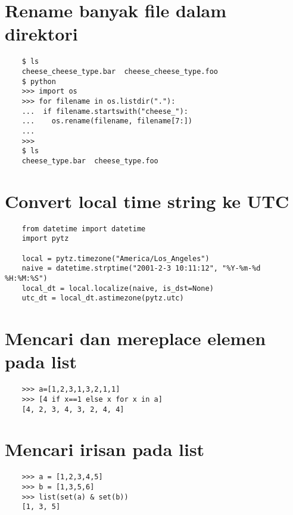 \documentclass{article}
\begin{document}
\section {Rename banyak file dalam direktori}
\begin{lstlisting}
	$ ls
	cheese_cheese_type.bar  cheese_cheese_type.foo
	$ python
	>>> import os
	>>> for filename in os.listdir("."):
	...  if filename.startswith("cheese_"):
	...    os.rename(filename, filename[7:])
	... 
	>>> 
	$ ls
	cheese_type.bar  cheese_type.foo
\end{lstlisting}

\section {Convert local time string ke UTC}
\begin{lstlisting}
	from datetime import datetime   
	import pytz
	
	local = pytz.timezone("America/Los_Angeles")
	naive = datetime.strptime("2001-2-3 10:11:12", "%Y-%m-%d %H:%M:%S")
	local_dt = local.localize(naive, is_dst=None)
	utc_dt = local_dt.astimezone(pytz.utc)
\end{lstlisting}

\section {Mencari dan mereplace elemen pada list}
\begin{lstlisting}
	>>> a=[1,2,3,1,3,2,1,1]
	>>> [4 if x==1 else x for x in a]
	[4, 2, 3, 4, 3, 2, 4, 4]
\end{lstlisting}

\section {Mencari irisan pada list}
\begin{lstlisting}
	>>> a = [1,2,3,4,5]
	>>> b = [1,3,5,6]
	>>> list(set(a) & set(b))
	[1, 3, 5]
\end{lstlisting}
\end{document}
